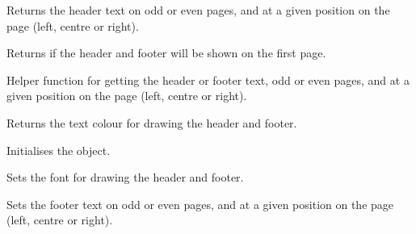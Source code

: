 
Returns the header text on odd or even pages, and at a given position on the page (left, centre or right).

\label{wxrichtextheaderfooterdatagetshowonfirstpage}


Returns \true if the header and footer will be shown on the first page.

\label{wxrichtextheaderfooterdatagettext}


Helper function for getting the header or footer text, odd or even pages, and at a given position on the page (left, centre or right).

\label{wxrichtextheaderfooterdatagettextcolour}


Returns the text colour for drawing the header and footer.

\label{wxrichtextheaderfooterdatainit}


Initialises the object.

\label{wxrichtextheaderfooterdatasetfont}


Sets the font for drawing the header and footer.

\label{wxrichtextheaderfooterdatasetfootertext}


Sets the footer text on odd or even pages, and at a given position on the page (left, centre or right).

